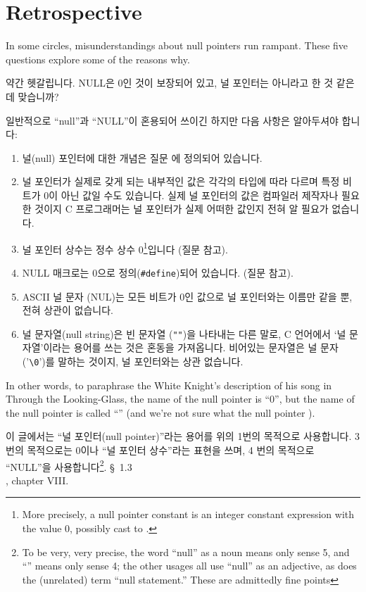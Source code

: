 \section{Retrospective}
In some circles, misunderstandings about null pointers run rampant.
These five questions explore some of the reasons why.

\begin{faq}
	약간 헷갈립니다.  NULL은 0인 것이 보장되어 있고,
	널 포인터는 아니라고 한 것 같은데 맞습니까?

\A
	일반적으로 ``null''과 ``NULL''이 혼용되어 쓰이긴 하지만
	다음 사항은 알아두셔야 합니다:

\begin{enumerate}
	\item	널(null) 포인터에 대한 개념은 질문 에 정의되어 있습니다.
	\item	널 포인터가 실제로 갖게 되는 내부적인 값은 각각의 타입에
	따라 다르며 특정 비트가 0이 아닌 값일 수도 있습니다.  실제 널 포인터의
	값은 컴파일러 제작자나 필요한 것이지 C 프로그래머는 널 포인터가
	실제 어떠한 값인지 전혀 알 필요가 없습니다.
	\item	널 포인터 상수는 정수 상수 0\footnote{More precisely, a null
	  pointer constant is an integer constant expression with the value 0,
	  possibly cast to .}입니다 (질문  참고).
	\item	NULL 매크로는 0으로 정의(\verb+#define+)되어 있습니다.
	(질문  참고).
	\item	ASCII 널 문자 (NUL)는 모든 비트가 0인 값으로
	널 포인터와는 이름만 같을 뿐, 전혀 상관이 없습니다.
	\item	널 문자열(null string)은 빈 문자열 (\verb+""+)을 나타내는
	다른 말로, C 언어에서 `널 문자열'이라는 용어를 쓰는 것은
	혼동을 가져옵니다.  비어있는 문자열은 널 문자('\verb+\0+')를
	말하는 것이지, 널 포인터와는 상관 없습니다.
\end{enumerate}
	In other words, to paraphrase the White Knight's description of his
	song in Through the Looking-Glass, the name of the null pointer is
	``0'', but the name of the null pointer is called ``'' (and
	we're not sure what the null pointer ).

	이 글에서는 ``널 포인터(null pointer)''라는 용어를 위의 1번의 목적으로
	사용합니다.  3 번의 목적으로는 0이나 ``널 포인터 상수''라는 표현을
	쓰며, 4 번의 목적으로 ``NULL''을 사용합니다\footnote{To be very,
	  very precise, the word ``null'' as a noun means only sense 5, and
	  ``'' means only sense 4; the other usages all use ``null''
	  as an adjective, as does the (unrelated) term ``null statement.''
	  These are admittedly fine points}.
\R
	\cite{hs} \S\ 1.3  \\
	, chapter VIII.
\end{faq}

